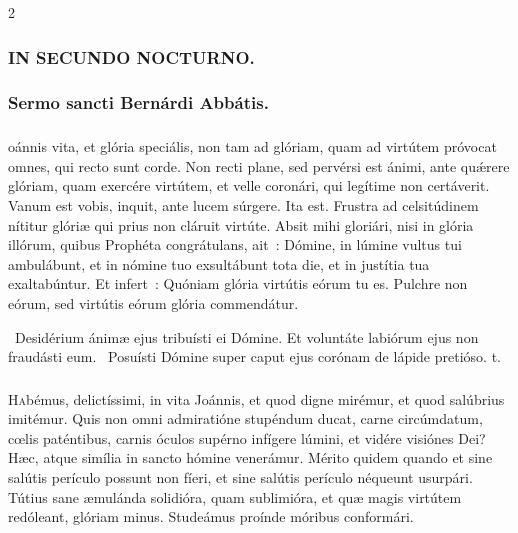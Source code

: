 \documentclass[9pt,twoside]{extarticle}
\begin{document}
\begin{multicols}{2}
\begin{tightlist}{}
\item {}
\end{tightlist}
\subsubsection*{\center \textsc{IN SECUNDO NOCTURNO.}}
\subsubsection*{\center Sermo sancti Bernárdi Abbátis.}
\subsubsection*{\center {}}
oánnis vita, et glória speciális, non tam ad glóriam, quam ad virtútem próvocat omnes, qui recto sunt corde. Non recti plane, sed pervérsi est ánimi, ante quǽrere glóriam, quam exercére virtútem, et velle coronári, qui legítime non certáverit. Vanum est vobis, inquit, ante lucem súrgere. Ita est. Frustra ad celsitúdinem nítitur glóriæ qui prius non cláruit virtúte. Absit mihi gloriári, nisi in glória illórum, quibus Prophéta congrátulans, ait~: Dómine, in lúmine vultus tui ambulábunt, et in nómine tuo exsultábunt tota die, et in justítia tua exaltabúntur. Et infert~: Quóniam glória virtútis eórum tu es. Pulchre non eórum, sed virtútis eórum glória commendátur.

\begin{tightlist}{}
\item {}~Desidérium ánimæ ejus tribuísti ei Dómine. \textred{*} Et voluntáte labiórum ejus non fraudásti eum. ~Posuísti Dómine super caput ejus corónam de lápide pretióso. t.
\end{tightlist}

\subsubsection*{\center{}}
\lettrine{H}abémus, delictíssimi, in vita Joánnis, et quod digne mirémur, et quod salúbrius imitémur. Quis non omni admiratióne stupéndum ducat, carne circúmdatum, cœlis paténtibus, carnis óculos supérno infígere lúmini, et vidére visiónes Dei? Hæc, atque simília in sancto hómine venerámur. Mérito quidem quando et sine salútis perículo possunt non fíeri, et sine salútis perículo néqueunt usurpári. Tútius sane æmulánda solidióra, quam sublimióra, et quæ magis virtútem redóleant, glóriam minus. Studeámus proínde móribus conformári.


\end{multicols}
\end{document}
